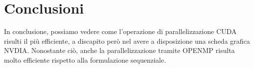 \documentclass[11pt]{article}
\begin{document}
    \clearpage

    \section{Conclusioni}\label{sec:conclusioni}
    In conclusione, possiamo vedere come l'operazione di parallelizzazione CUDA risulti il più efficiente, a
    discapito però nel avere a disposizione una scheda grafica NVDIA\@.
    Nonostante ciò, anche la parallelizzazione tramite OPENMP risulta molto efficiente rispetto alla formulazione
    sequenziale.
\end{document}
